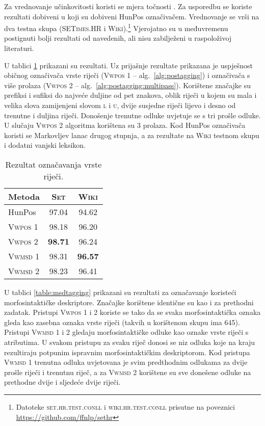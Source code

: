 Za vrednovanje učinkovitosti koristi se mjera točnosti . Za
usporedbu se koriste rezultati dobiveni u \citep{agic2013lemmatization} koji su
dobiveni HunPos označivačem. Vrednovanje se vrši na dva testna skupa
(\textsc{SETimes.HR} i \textsc{Wiki}).\footnote{Datoteke
\textsc{set.hr.test.conll} i \textsc{wiki.hr.test.conll} prisutne na poveznici
\url{https://github.com/ffnlp/sethr}} Vjerojatno su u međuvremenu postignuti
bolji rezultati od navedenih, ali nisu zabilježeni u raspoloživoj literaturi.

U tablici \ref{table:postagging} prikazani su rezultati. Uz prijašnje rezultate
prikazana je uspješnost običnog označivača vrste riječi (\textsc{Vwpos 1} --
alg.~\ref{alg:postagging}) i označivača s više prolaza (\textsc{Vwpos 2} --
alg.~\ref{alg:postagging:multipass}). Korištene značajke su prefiksi i sufiksi
do najveće duljine od pet znakova, oblik riječi u kojem su mala i velika slova
zamijenjeni slovom \textsc{l} i \textsc{u}, dvije susjedne riječi lijevo i desno
od trenutne i duljina riječi. Donošenje trenutne odluke uvjetuje se s tri prošle
odluke. U slučaju \textsc{Vwpos 2} algoritma korištena su 3 prolaza. Kod HunPos
označivača koristi se Markovljev lanac drugog stupnja, a za rezultate na
\textsc{Wiki} testnom skupu i dodatni vanjski leksikon.

\begin{table}
\centering
\caption[Rezultat označavanja vrste riječi.]{Rezultat označavanja vrste riječi.}
\label{table:postagging}
\begin{tabular}{|l|c|c|}
\hline
Metoda             & \textsc{Set}   & \textsc{Wiki}  \\ \hline \hline
HunPos             & 97.04          & 94.62          \\
\textsc{Vwpos 1}   & 98.18          & 96.20          \\
\textsc{Vwpos 2}   & \textbf{98.71} & 96.24          \\
\textsc{Vwmsd} 1   & 98.31          & \textbf{96.57} \\
\textsc{Vwmsd} 2   & 98.23          & 96.41          \\ \hline
\end{tabular}
\end{table}

U tablici \ref{table:msdtagging} prikazani su rezultati za označavanje koristeći
morfosintaktičke deskriptore. Značajke korištene identične su kao i za prethodni
zadatak. Pristupi \textsc{Vwpos 1} i \textsc{2} koriste se tako da se svaka
morfosintaktička oznaka gleda kao zasebna oznaka vrste riječi (takvih u
korištenom skupu ima 645). Pristupi \textsc{Vwmsd} 1 i 2 gledaju
morfosintaktičke odluke kao oznake vrste riječi s atributima. U svakom pristupu
za svaku riječ donosi se niz odluka koje na kraju rezultiraju potpunim ispravnim
morfosintaktičkim deskriptorom.  Kod pristupa \textsc{Vwmsd 1} trenutna odluka
uvjetovana je svim predthodnim odlukama za dvije prošle riječi i trenutnu riječ,
a za \textsc{Vwmsd 2} korištene su sve donešene odluke na prethodne dvije i
sljedeće dvije riječi.

